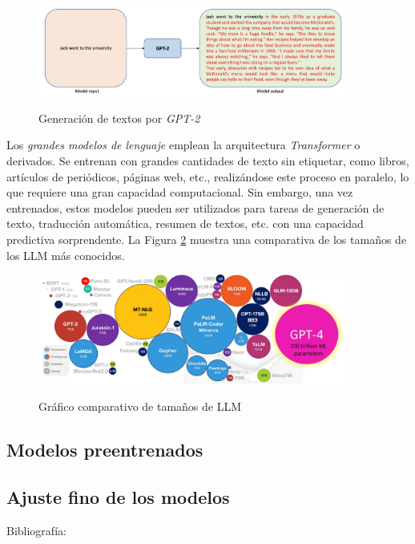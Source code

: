 \begin{figure}[H]
    \caption{Generación de textos por \textit{GPT-2}}
    \centering
    \includegraphics[width=0.9\textwidth]{./figuras/GPT2_text_generation.png}
    \label{fig:gpt2_text_generation}
\end{figure}

Los \textit{grandes modelos de lenguaje} emplean la arquitectura \textit{Transformer} o derivados. Se entrenan con grandes cantidades de texto sin etiquetar, como libros, artículos de periódicos, páginas web, etc., realizándose este proceso en paralelo, lo que requiere una gran capacidad computacional. Sin embargo, una vez entrenados, estos modelos pueden ser utilizados para tareas de generación de texto, traducción automática, resumen de textos, etc. con una capacidad predictiva sorprendente. La Figura \ref{fig:llm_sizes} muestra una comparativa de los tamaños de los LLM más conocidos.

\begin{figure}[H]
    \caption{Gráfico comparativo de tamaños de LLM}
    \centering
    \includegraphics[width=0.9\textwidth]{./figuras/LLMs_sizes.png}
    \label{fig:llm_sizes}
\end{figure}

\subsection{Modelos preentrenados}
\subsection{Ajuste fino de los modelos}
Bibliografía: \cite{chamandFinetuneYourClassifier2022}

